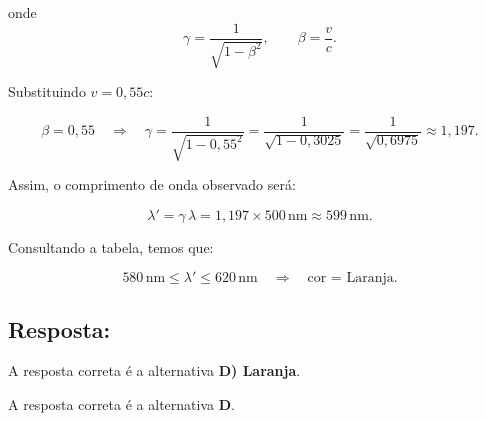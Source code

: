 \begin{flushleft}
\begin{flushleft}
onde
\[
\gamma = \frac{1}{\sqrt{1-\beta^2}}, 
\qquad \beta = \frac{v}{c}.
\]

Substituindo $v=0,55c$:

\[
\beta = 0,55 
\quad \Rightarrow \quad 
\gamma = \frac{1}{\sqrt{1-0,55^2}} 
= \frac{1}{\sqrt{1-0,3025}} 
= \frac{1}{\sqrt{0,6975}} 
\approx 1,197.
\]

Assim, o comprimento de onda observado ser\'a:

\[
\lambda' = \gamma \, \lambda = 1,197 \times 500\,\text{nm} \approx 599\,\text{nm}.
\]

Consultando a tabela, temos que:

\[
580\,\text{nm} \leq \lambda' \leq 620\,\text{nm} \quad \Rightarrow \quad \text{cor = Laranja}.
\]

\subsection*{Resposta:}

A resposta correta \'e a alternativa \colorbox{orange!50}{\textbf{D) Laranja}}.

\end{flushleft}


\medskip
A resposta correta é a alternativa \colorbox{green!50}{\textbf{D}}.

\end{flushleft}


%
%
%
%
%
%
%
